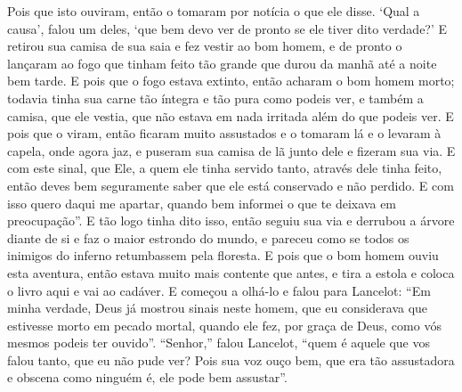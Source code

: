 Pois que isto ouviram, então o tomaram por notícia o que ele disse. ‘Qual a
causa’, falou um deles, ‘que bem devo ver de pronto se ele tiver dito verdade?’
E retirou sua camisa de sua saia e fez vestir ao bom homem, e de pronto o
lançaram ao fogo que tinham feito tão grande que durou da manhã até a noite bem
tarde. E pois que o fogo estava extinto, então acharam o bom homem morto;
todavia tinha sua carne tão íntegra e tão pura como podeis ver, e também a
camisa, que ele vestia, que não estava em nada irritada além do que podeis ver.
E pois que o viram, então ficaram muito assustados e o tomaram lá e o levaram à
capela, onde agora jaz, e puseram sua camisa de lã junto dele e fizeram sua
via. E com este sinal, que Ele, a quem ele tinha servido tanto, através dele
tinha feito, então deves bem seguramente saber que ele está conservado e não
perdido. E com isso quero daqui me apartar, quando bem informei o que te
deixava em preocupação”.  E tão logo tinha dito isso, então
seguiu sua via e derrubou a árvore diante de si e faz o maior estrondo do
mundo, e pareceu como se todos os inimigos do inferno retumbassem pela
floresta. E pois que o bom homem ouviu esta aventura, então estava muito mais
contente que antes, e tira a estola e coloca o livro aqui e vai ao cadáver. E
começou a olhá-lo e falou para Lancelot: “Em minha verdade, Deus já mostrou
sinais neste homem, que eu considerava que estivesse morto em pecado mortal,
quando ele fez, por graça de Deus, como vós mesmos podeis ter ouvido”.
“Senhor,” falou Lancelot, “quem é aquele que vos falou tanto, que eu não pude
ver? Pois sua voz ouço bem, que era tão assustadora e obscena  como ninguém é,
ele pode bem assustar”.

